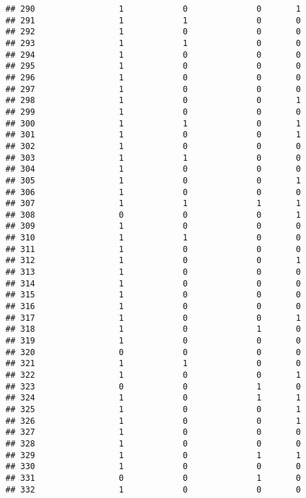 \documentclass[]{article}
\begin{document}
\begin{verbatim}
## 290                 1            0              0       1
## 291                 1            1              0       0
## 292                 1            0              0       0
## 293                 1            1              0       0
## 294                 1            0              0       0
## 295                 1            0              0       0
## 296                 1            0              0       0
## 297                 1            0              0       0
## 298                 1            0              0       1
## 299                 1            0              0       0
## 300                 1            1              0       1
## 301                 1            0              0       1
## 302                 1            0              0       0
## 303                 1            1              0       0
## 304                 1            0              0       0
## 305                 1            0              0       1
## 306                 1            0              0       0
## 307                 1            1              1       1
## 308                 0            0              0       1
## 309                 1            0              0       0
## 310                 1            1              0       0
## 311                 1            0              0       0
## 312                 1            0              0       1
## 313                 1            0              0       0
## 314                 1            0              0       0
## 315                 1            0              0       0
## 316                 1            0              0       0
## 317                 1            0              0       1
## 318                 1            0              1       0
## 319                 1            0              0       0
## 320                 0            0              0       0
## 321                 1            1              0       0
## 322                 1            0              0       1
## 323                 0            0              1       0
## 324                 1            0              1       1
## 325                 1            0              0       1
## 326                 1            0              0       1
## 327                 1            0              0       0
## 328                 1            0              0       0
## 329                 1            0              1       1
## 330                 1            0              0       0
## 331                 0            0              1       0
## 332                 1            0              0       0

\end{verbatim}
\end{document}
